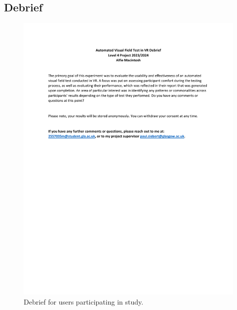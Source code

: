 \documentclass{l4proj}
\begin{document}
\begin{appendices}
\subsection{Debrief} \label{appendix:debrief}
\begin{figure}[htbp]
    \centering
    \includegraphics[width=0.9\linewidth]{dissertation/images/Debrief.pdf}    
    \caption{Debrief for users participating in study.}
\end{figure}
\newpage

\end{appendices}
\end{document}
